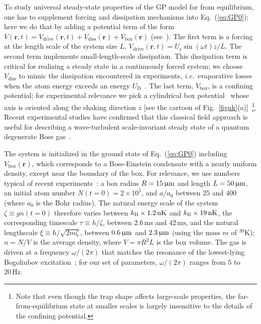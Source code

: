\documentclass[prl,aps,twocolumn, a4paper,longbibliography,superscriptaddress]{revtex4-2}
\newcommand{\mum}{\upmu{\rm m}}
\newcommand{\kB}{k_{\textrm{B}}}
\newcommand{\UD}{U_{\textrm{D}}}
\newcommand{\Us}{U_{\textrm{s}}}
\begin{document}
To study universal steady-state properties of the GP model far from equilibrium, one has to supplement forcing and dissipation mechanisms into Eq.~(\ref{eq:GP0}); here we do that by adding a potential term of the form $V(\boldsymbol{r},t)=V_\text{drive}(\boldsymbol{r},t)+V_\text{diss}(\boldsymbol{r})+V_\text{box}(\boldsymbol{r})$ (see~\cite{Supplementary}). The first term is a forcing at the length scale of the system size $L$, $V_\text{drive}(\boldsymbol{r},t)=\Us \sin(\omega t)z/L$.  The second term implements small-length-scale dissipation. This dissipation term is critical for realizing a steady state in a continuously forced system; we choose $V_\text{diss}$ to mimic the dissipation encountered in experiments, \emph{i.e.}\ evaporative losses when the atom energy exceeds an energy $\UD$~\cite{Navon:2019}. The last term, $V_\text{box}$, is a confining potential; for experimental relevance we pick a cylindrical box potential~\cite{Navon:2021,Dogra:2023} whose axis is oriented along the shaking direction $z$ [see the cartoon of Fig.~\ref{fignk}(a)]~\footnote{Note that even though the trap shape affects large-scale properties, the far-from-equilibrium state at smaller scales is largely insensitive to the details of the confining potential.}. Recent experimental studies have confirmed that this classical field approach is useful for describing a wave-turbulent scale-invariant steady state of a quantum degenerate Bose gas~\cite{Navon:2016,Navon:2019}.



The system is initialized in the ground state of Eq.~(\ref{eq:GP0}) including $V_\text{box}(\boldsymbol{r})$, which corresponds to a Bose-Einstein condensate with a nearly uniform density, except near the boundary of the box. For relevance, we use numbers typical of recent experiments~\cite{Dogra:2023}: a box radius $R=15\,\mum$ and length $L=50\,\mum$, an initial atom number $N(t=0)=2\times 10^5$, and $a/a_0$ between $25$ and $400$ (where $a_0$ is the Bohr radius). The natural energy scale of the system $\zeta\equiv gn(t=0)$ therefore varies between $\kB\times 1.2\,{\rm nK}$ and $\kB\times19\,{\rm nK}$, the corresponding timescale $\tau\equiv h/\zeta$, between $2.6\,\textrm{ms}$ and $42\,\textrm{ms}$, and the natural lengthscale $\xi\equiv\hbar/\sqrt{2m\zeta}$, between $0.6\,\mum$ and $2.3\,\mum$ (using the mass $m$ of $^{39}$K); $n=N/V$ is the average density, where $V=\pi R^2L$ is the box volume.  The gas is driven at a frequency $\omega/(2\pi)$ that matches the resonance of the lowest-lying Bogoliubov excitation~\cite{Garratt:2019}; for our set of parameters, $\omega/(2\pi)$ ranges from $5$ to $20\,\textrm{Hz}$.
\end{document}
